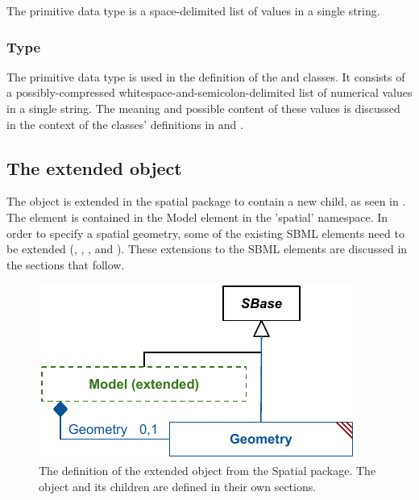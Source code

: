 The  primitive data type is a space-delimited list of  values in a single string.  

\subsubsection{Type \fixttspace{}}
\label{primtype-arrayData}

The  primitive data type is used in the definition of the \SampledField and \ParametricObject classes.  It consists of a possibly-compressed whitespace-and-semicolon-delimited list of numerical values in a single string.  The meaning and possible content of these values is discussed in the context of the classes' definitions in  and .



\subsection{The extended \Model object}
\label{extended-model-class}
The \Model object is extended in the spatial package to contain a new \Geometry child, as seen in
. The \Geometry element is contained in the Model element in the 'spatial' namespace. In order to specify a spatial geometry, some of the existing SBML elements need to be extended (\Compartment, \Species, \Parameter, and \Reaction). These extensions to the SBML elements are discussed in the sections that follow.
 
\begin{figure}[ht]
  \includegraphics{figs/extended-model-uml}
  \caption{The definition of the extended \Model object from the Spatial package.  The \Geometry object and its children are defined in their own sections.}
  \label{model-uml}
\end{figure}




